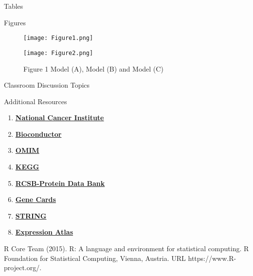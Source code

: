 \begin{frame}[t]
\begin{columns}[t]
\begin{column}{\onecolwid}
\begin{alertblock}{Tables}
\end{alertblock}
\begin{alertblock}{Figures}
\begin{figure}[H]
	\centering
	\begin{minipage}[b]{0.5\linewidth}
		\texttt{[image: Figure1.png]}
	\end{minipage}\hfill
	\begin{minipage}[b]{0.5\linewidth}
		\texttt{[image: Figure2.png]}
	\end{minipage}\hfill
	\caption{Figure 1 Model (A), Model (B) and Model (C)}
	\label{fig:Figure1}
\end{figure}
\end{alertblock}
\begin{alertblock}{Classroom Discussion Topics}
\end{alertblock}
\begin{alertblock}{Additional Resources}
\begin{enumerate}
	\item \href{http://www.cancer.gov}{\textbf{National Cancer Institute}}
	\item \href{http://www.bioconductor.org}{\textbf{Bioconductor}}
	\item \href{http://www.omim.org}{\textbf{OMIM}}
	\item \href{http://www.genome.jp/kegg/}{\textbf{KEGG}}
	\item \href{http://www.rcsb.org}{\textbf{RCSB-Protein Data Bank}}
	\item \href{http://www.genecards.org}{\textbf{Gene Cards}}
	\item \href{http://string-db.org}{\textbf{STRING}}
	\item \href{http://www.ebi.ac.uk/gxa/home}{\textbf{Expression Atlas}}
\end{enumerate}
\end{alertblock}

\begin{thebibliography}{00}
\footnotesize		 		
{}R Core Team (2015). 
\newblock R: A language and environment for statistical computing. R Foundation for Statistical Computing, Vienna, Austria.
\newblock URL https://www.R-project.org/.		
\end{thebibliography}
\end{column}
\end{columns}
\end{frame}

